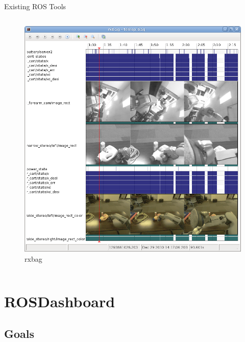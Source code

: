 \documentclass[compress]{beamer}
\begin{document}
\begin{frame}{Existing ROS Tools}
\begin{columns}
\begin{column}{.4\textwidth}
\begin{figure}[t]
    \includegraphics[width=.85\textwidth]{images/rxbag_screenshot.png}
    \caption{rxbag}
\end{figure}
\end{column}
\end{columns}
\end{frame}

\section{ROSDashboard}
\subsection{Goals}
\end{document}
